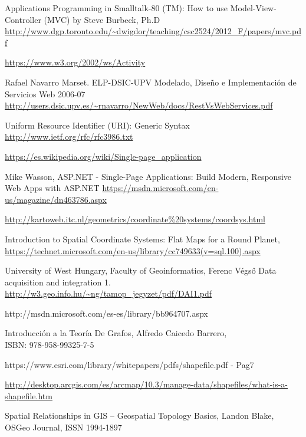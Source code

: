 \begin{thebibliography}{99}
	 Applications Programming in Smalltalk-80 (TM): How to use Model-View-Controller (MVC) by Steve Burbeck, Ph.D \url{http://www.dgp.toronto.edu/~dwigdor/teaching/csc2524/2012_F/papers/mvc.pdf}


 \url{https://www.w3.org/2002/ws/Activity}

 Rafael Navarro Marset. ELP-DSIC-UPV
Modelado, Diseño e Implementación de Servicios Web 2006-07 \url{http://users.dsic.upv.es/~rnavarro/NewWeb/docs/RestVsWebServices.pdf}


 Uniform Resource Identifier (URI): Generic Syntax \url{http://www.ietf.org/rfc/rfc3986.txt}

 \url{https://es.wikipedia.org/wiki/Single-page_application}

 Mike Wasson, ASP.NET - Single-Page Applications: Build Modern, Responsive Web Apps with ASP.NET  \url{https://msdn.microsoft.com/en-us/magazine/dn463786.aspx}


	 \url{http://kartoweb.itc.nl/geometrics/coordinate%20systems/coordsys.html}


	 Introduction to Spatial Coordinate Systems: Flat Maps for a Round Planet,\\ \url{https://technet.microsoft.com/en-us/library/cc749633(v=sql.100).aspx}

	 University of West Hungary, Faculty of Geoinformatics, Ferenc Végső
Data acquisition and integration 1. \url{http://w3.geo.info.hu/~ng/tamop_jegyzet/pdf/DAI1.pdf}


	 http://msdn.microsoft.com/es-es/library/bb964707.aspx

	Introducción a la Teoría De Grafos,
	Alfredo Caicedo Barrero,
	\\ISBN: 978-958-99325-7-5

	 https://www.esri.com/library/whitepapers/pdfs/shapefile.pdf - Pag7


	 \url{http://desktop.arcgis.com/es/arcmap/10.3/manage-data/shapefiles/what-is-a-shapefile.htm}

	Spatial Relationships in GIS – Geospatial Topology Basics,
	Landon Blake,
	\\OSGeo Journal,
	ISSN 1994-1897

\end{thebibliography}
